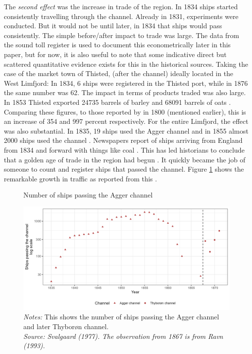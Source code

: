 \documentclass[11pt]{article}
\begin{document}
The \textit{second effect} was the increase in trade of the region. In 1834 ships started consistently travelling through the channel. Already in 1831, experiments were conducted. But it would not be until later, in 1834 that ships would pass consistently. The simple before/after impact to trade was large. The data from the sound toll register is used to document this econometrically later in this paper, but for now, it is also useful to note that some indicative direct but scattered quantitative evidence exists for this in the historical sources. Taking the case of the market town of Thisted, (after the channel) ideally located in the West Limfjord: In 1834, 6 ships were registered in the Thisted port, while in 1876 the same number was 62. The impact in terms of products traded was also large. In 1853 Thisted exported 24735 barrels of barley and 68091 barrels of oats \citep[p. 153-159]{ThistedLokalhistorie1974}. Comparing these figures, to those reported by \cite{Aagard1802} in 1800 (mentioned earlier), this is an increase of 354 and 997 percent respectively. For the entire Limfjord, the effect was also substantial. In 1835, 19 ships used the Agger channel and in 1855 almost 2000 ships used the channel \citep{Svalgaard1977}. Newspapers report of ships arriving from England from 1834 and forward with things like coal \citep{ThistedAmtsavis1834, RoskildeAmt1836, ViborgStift1852}. This has led historians to conclude that a golden age of trade in the region had begun \citep{Poulsen2019, Ravn1993}. It quickly became the job of someone to count and register ships that passed the channel. Figure \ref{fig:channel} shows the remarkable growth in traffic as reported from this \citep{Svalgaard1977}.

\begin{figure}[h]
\begin{center}
  \caption{\label{fig:channel} Number of ships passing the Agger channel}
  \includegraphics[width=1\textwidth]{Plots/Ship_trafic_channel.png}
  \parbox{0.9\textwidth}{
  \caption*{\footnotesize \textit{Notes:} This shows the number of ships passing the Agger channel and later Thyborøn channel. \\ \textit{Source: Svalgaard (1977). The observation from 1867 is from Ravn (1993).}}
}
\end{center}
\end{figure}
\end{document}

